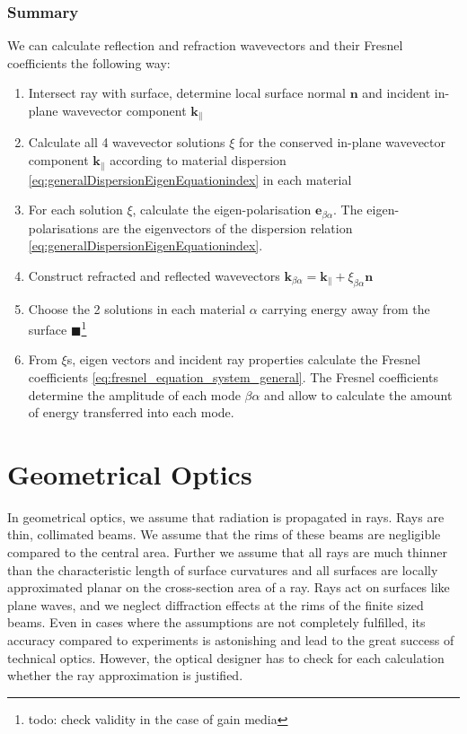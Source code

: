 \documentclass[12pt,a4paper,twoside,openright,BCOR10mm,headsepline,titlepage,abstracton,chapterprefix,final]{scrreprt}
\newcommand\Vector[1]{{\mathbf{#1}}}
\newcommand\wavenumber{k}
\newcommand\Wavevector{\Vector{\wavenumber}}
\newcommand{\remark}[1]{{\color{red}$\blacksquare$}\footnote{{\color{red}#1}}}
\begin{document}
\subsection{Summary}
We can calculate reflection and refraction wavevectors and their Fresnel coefficients the following way:
\begin{enumerate}
 \item Intersect ray with surface, determine local surface normal $\Vector{n}$ and incident in-plane wavevector component $\Wavevector_\parallel$
 \item Calculate all 4 wavevector solutions $\xi$ for the conserved in-plane wavevector component $\Wavevector_\parallel$ 
       according to material dispersion \eqref{eq:generalDispersionEigenEquationindex} in each material
 \item For each solution $\xi$, calculate the eigen-polarisation $\Vector{e}_{\beta\alpha}$.
       The eigen-polarisations are the eigenvectors of the dispersion relation \eqref{eq:generalDispersionEigenEquationindex}.
 \item Construct refracted and reflected wavevectors $\Wavevector_{\beta\alpha} = \Wavevector_\parallel + \xi_{\beta\alpha} \Vector{n}$
 \item Choose the 2 solutions in each material $\alpha$ carrying energy away from the surface
       \remark{todo: check validity in the case of gain media}
 \item From $\xi$s, eigen vectors and incident ray properties calculate the Fresnel coefficients \eqref{eq:fresnel_equation_system_general}.
       The Fresnel coefficients determine the amplitude of each mode $\beta\alpha$ 
       and allow to calculate the amount of energy transferred into each mode.
\end{enumerate}


\chapter{Geometrical Optics}
In geometrical optics, we assume that radiation is propagated in rays. Rays are thin, collimated beams. 
We assume that the rims of these beams are negligible compared to the central area. 
Further we assume that all rays are much thinner than the characteristic length of surface curvatures and 
all surfaces are locally approximated planar on the cross-section area of a ray.
Rays act on surfaces like plane waves, and we neglect diffraction effects at the rims of the finite sized beams.
Even in cases where the assumptions are not completely fulfilled, its accuracy compared to experiments is 
astonishing and lead to the great success of technical optics.
However, the optical designer has to check for each calculation whether the ray approximation is justified.
\end{document}
